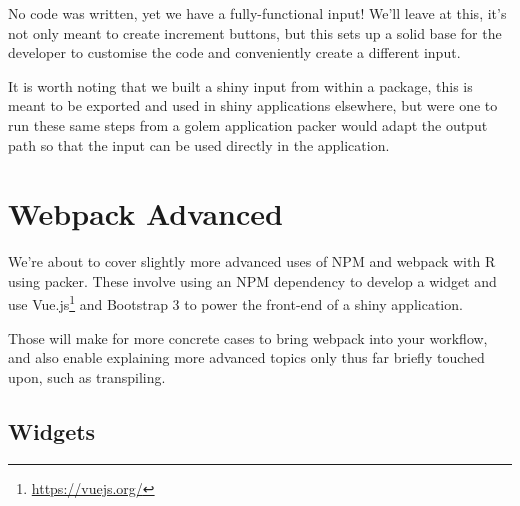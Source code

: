 \documentclass[
]{krantz}
\makeatletter
\newenvironment{Shaded}{\begin{snugshade}}{\end{snugshade}}
\newcommand{\ControlFlowTok}[1]{\textcolor[rgb]{0.27,0.27,0.27}{\textbf{#1}}}
\newcommand{\DecValTok}[1]{\textcolor[rgb]{0.06,0.06,0.06}{#1}}
\newcommand{\KeywordTok}[1]{\textcolor[rgb]{0.27,0.27,0.27}{\textbf{#1}}}
\newcommand{\NormalTok}[1]{#1}
\newcommand{\OperatorTok}[1]{\textcolor[rgb]{0.43,0.43,0.43}{\textbf{#1}}}
\newcommand{\StringTok}[1]{\textcolor[rgb]{0.5,0.5,0.5}{#1}}
\renewcommand{\href}[2]{#2\footnote{\url{#1}}}
\newenvironment{kframe}{%
\medskip{}
\setlength{\fboxsep}{.8em}
 \def\at@end@of@kframe{}%
 \ifinner\ifhmode%
  \def\at@end@of@kframe{\end{minipage}}%
  \begin{minipage}{\columnwidth}%
 \fi\fi%
 \def\FrameCommand##1{\hskip\@totalleftmargin \hskip-\fboxsep
 \colorbox{shadecolor}{##1}\hskip-\fboxsep
     \hskip-\linewidth \hskip-\@totalleftmargin \hskip\columnwidth}%
 \MakeFramed {\advance\hsize-\width
   \@totalleftmargin\z@ \linewidth\hsize
   \@setminipage}}%
 {\par\unskip\endMakeFramed%
 \at@end@of@kframe}
\renewenvironment{Shaded}{\begin{kframe}}{\end{kframe}}
\makeatother
\begin{document}
\begin{Shaded}
\end{Shaded}

No code was written, yet we have a fully-functional input! We'll leave at this, it's not only meant to create increment buttons, but this sets up a solid base for the developer to customise the code and conveniently create a different input.

It is worth noting that we built a shiny input from within a package, this is meant to be exported and used in shiny applications elsewhere, but were one to run these same steps from a golem application packer would adapt the output path so that the input can be used directly in the application.

\hypertarget{packer-adv}{%
\chapter{Webpack Advanced}\label{packer-adv}}

We're about to cover slightly more advanced uses of NPM and webpack with R using packer. These involve using an NPM dependency to develop a widget and use \href{https://vuejs.org/}{Vue.js} and Bootstrap 3 to power the front-end of a shiny application.

Those will make for more concrete cases to bring webpack into your workflow, and also enable explaining more advanced topics only thus far briefly touched upon, such as transpiling.

\hypertarget{packer-adv-widgets}{%
\section{Widgets}\label{packer-adv-widgets}}
\end{document}
